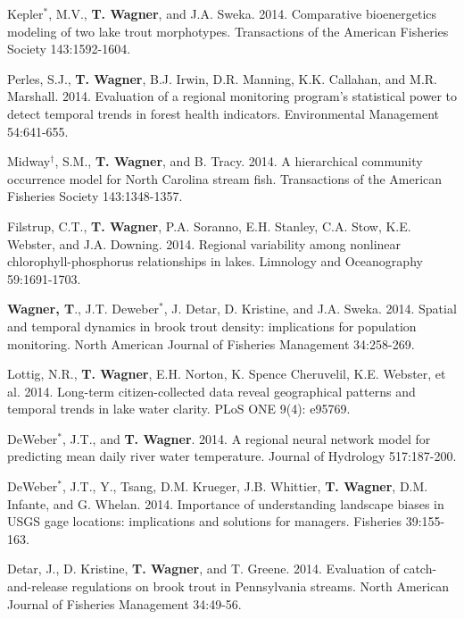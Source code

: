 \documentclass[10pt]{article}
\begin{document}
\begin{flushleft}
\begin{etaremune}[start=41]
\item Kepler$^*$, M.V., {\bf T. Wagner}, and J.A. Sweka. 2014. Comparative bioenergetics modeling of two lake trout morphotypes. Transactions of the American Fisheries Society 143:1592-1604.

\item Perles, S.J., {\bf T. Wagner}, B.J. Irwin, D.R. Manning, K.K. Callahan, and M.R. Marshall. 2014. Evaluation of a regional monitoring program's statistical power to detect temporal trends in forest health indicators. Environmental Management 54:641-655.

\item Midway$^\dagger$, S.M., {\bf T. Wagner}, and B. Tracy. 2014. A hierarchical community occurrence model for North Carolina stream fish. Transactions of the American Fisheries Society 143:1348-1357.

\item Filstrup, C.T., {\bf T. Wagner}, P.A. Soranno, E.H. Stanley, C.A. Stow, K.E. Webster, and J.A. Downing. 2014. Regional variability among nonlinear chlorophyll-phosphorus relationships in lakes. Limnology and Oceanography 59:1691-1703. 

\item {\bf Wagner, T}., J.T. Deweber$^*$, J. Detar, D. Kristine, and J.A. Sweka. 2014. Spatial and temporal dynamics in brook trout density: implications for population monitoring. North American Journal of Fisheries Management 34:258-269.

\item Lottig, N.R., {\bf T. Wagner}, E.H. Norton, K. Spence Cheruvelil, K.E. Webster, et al. 2014. Long-term citizen-collected data reveal geographical patterns and temporal trends in lake water clarity. PLoS ONE 9(4): e95769. 

\item DeWeber$^*$, J.T., and {\bf T. Wagner}. 2014. A regional neural network model for predicting mean daily river water temperature. Journal of Hydrology 517:187-200.

\item DeWeber$^*$, J.T., Y., Tsang, D.M. Krueger, J.B. Whittier, {\bf T. Wagner}, D.M. Infante, and G. Whelan. 2014. Importance of understanding landscape biases in USGS gage locations: implications and solutions for managers. Fisheries 39:155-163. 

\item Detar, J., D. Kristine, {\bf T. Wagner}, and T. Greene. 2014. Evaluation of catch-and-release regulations on brook trout in Pennsylvania streams. North American Journal of Fisheries Management 34:49-56.


\end{etaremune}
\end{flushleft}
\end{document}
